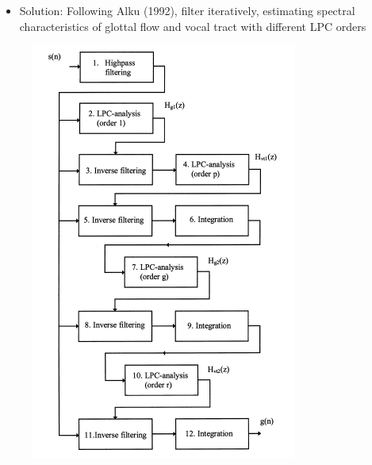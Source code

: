 \documentclass{beamer}
\begin{document}
\begin{frame}
\begin{itemize}
\item{Solution: Following Alku (1992), filter iteratively, estimating spectral characteristics of glottal flow and vocal tract with different LPC orders}
\end{itemize}
\begin{figure}
\includegraphics[scale=0.4,keepaspectratio]{iaif_block.png}
\end{figure}
\end{frame}
\end{document}
